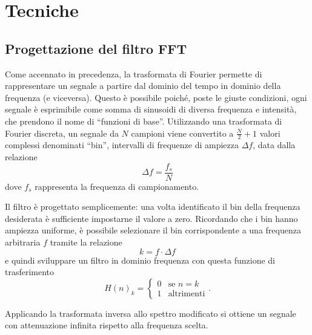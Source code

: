 \section{Tecniche}
\subsection{Progettazione del filtro FFT}
Come accennato in precedenza, la trasformata di Fourier permette di rappresentare un segnale a partire dal dominio del tempo in dominio della frequenza (e viceversa).
Questo è possibile poiché, poste le giuste condizioni, ogni segnale è esprimibile come somma di sinusoidi di diversa frequenza e intensità, che prendono il nome di ``funzioni di base''.
Utilizzando una trasformata di Fourier discreta, un segnale da $N$ campioni viene convertito a $\frac{N}{2}+1$ valori complessi denominati ``bin'', intervalli di frequenze di ampiezza $\Delta f$, data dalla relazione
$$
\Delta f = \dfrac{f_s}{N}
$$
dove $f_s$ rappresenta la frequenza di campionamento.

Il filtro è progettato semplicemente: una volta identificato il bin della frequenza desiderata è sufficiente impostarne il valore a zero.
Ricordando che i bin hanno ampiezza uniforme, è possibile selezionare il bin corrispondente a una frequenza arbitraria $f$ tramite la relazione
$$
k = f \cdot \Delta f
$$
e quindi sviluppare un filtro in dominio frequenza con questa funzione di trasferimento
$$
H(n)_k =
\begin{cases}
    0 & \text{se }n = k\\
    1 & \text{altrimenti}
\end{cases}.
$$

Applicando la trasformata inversa allo spettro modificato si ottiene un segnale con attenuazione infinita rispetto alla frequenza scelta.

